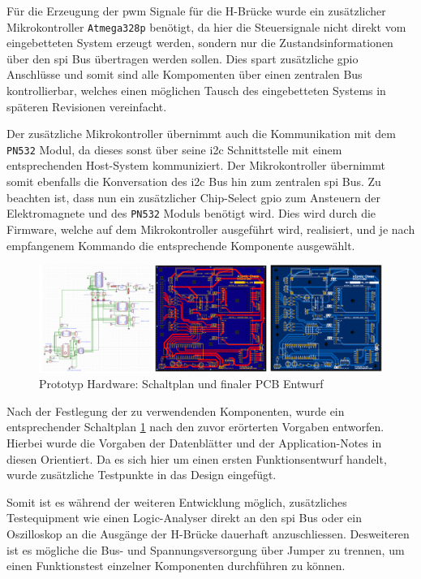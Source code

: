Für die Erzeugung der \gls{pwm} Signale für die H-Brücke wurde ein
zusätzlicher Mikrokontroller \passthrough{\lstinline!Atmega328p!}
benötigt, da hier die Steuersignale nicht direkt vom eingebetteten
System erzeugt werden, sondern nur die Zustandsinformationen über den
\gls{spi} Bus übertragen werden sollen. Dies spart zusätzliche
\gls{gpio} Anschlüsse und somit sind alle Kompomenten über einen
zentralen Bus kontrollierbar, welches einen möglichen Tausch des
eingebetteten Systems in späteren Revisionen vereinfacht.

Der zusätzliche Mikrokontroller übernimmt auch die Kommunikation mit dem
\passthrough{\lstinline!PN532!} Modul, da dieses sonst über seine
\gls{i2c} Schnittstelle mit einem entsprechenden Host-System
kommuniziert. Der Mikrokontroller übernimmt somit ebenfalls die
Konversation des \gls{i2c} Bus hin zum zentralen \gls{spi} Bus. Zu
beachten ist, dass nun ein zusätzlicher Chip-Select \gls{gpio} zum
Ansteuern der Elektromagnete und des \passthrough{\lstinline!PN532!}
Moduls benötigt wird. Dies wird durch die Firmware, welche auf dem
Mikrokontroller ausgeführt wird, realisiert, und je nach empfangenem
Kommando die entsprechende Komponente ausgewählt.

\begin{figure}
\centering
\includegraphics{images/ATC_DK_HW_SCHEM.png}
\caption{Prototyp Hardware: Schaltplan und finaler PCB Entwurf
\label{ATC_Schematic_DK}}
\end{figure}

Nach der Festlegung der zu verwendenden Komponenten, wurde ein
entsprechender Schaltplan \ref{ATC_Schematic_DK} nach den zuvor
erörterten Vorgaben entworfen. Hierbei wurde die Vorgaben der
Datenblätter und der Application-Notes in diesen Orientiert. Da es sich
hier um einen ersten Funktionsentwurf handelt, wurde zusätzliche
Testpunkte in das Design eingefügt.

Somit ist es während der weiteren Entwicklung möglich, zusätzliches
Testequipment wie einen Logic-Analyser direkt an den \gls{spi} Bus oder
ein Oszilloskop an die Ausgänge der H-Brücke dauerhaft anzuschliessen.
Desweiteren ist es mögliche die Bus- und Spannungsversorgung über Jumper
zu trennen, um einen Funktionstest einzelner Komponenten durchführen zu
können.

